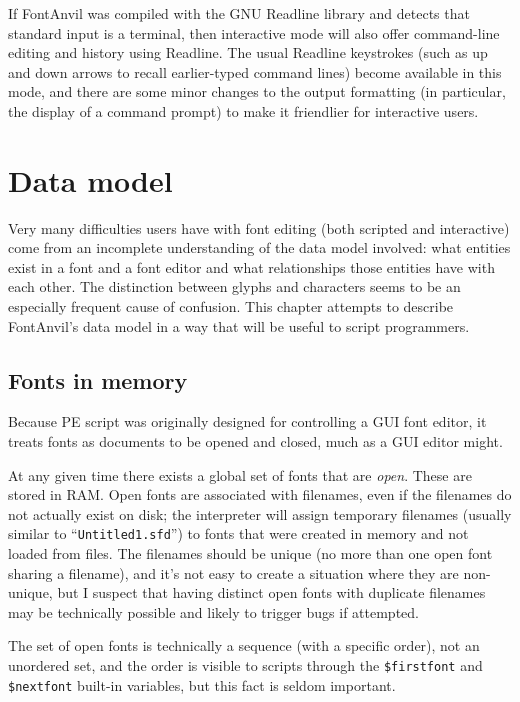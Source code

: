 \documentclass[11pt]{report}
\begin{document}
If FontAnvil was compiled with the GNU Readline library and detects that
standard input is a terminal, then interactive mode will also offer
command-line editing and history using Readline.  The usual Readline
keystrokes (such as up and down arrows to recall earlier-typed command
lines) become available in this mode, and there are some minor changes to
the output formatting (in particular, the display of a command prompt) to
make it friendlier for interactive users.


\chapter{Data model}
\label{sec:data-model}

Very many difficulties users have with font editing (both scripted and
interactive) come from an incomplete understanding of the data model
involved: what entities exist in a font and a font editor and what
relationships those entities have with each other.  The distinction between
glyphs and characters seems to be an especially frequent cause of confusion. 
This chapter attempts to describe FontAnvil's data model in a way that will
be useful to script programmers.

\section{Fonts in memory}

Because PE script was originally designed for controlling a GUI font
editor, it treats fonts as documents to be opened and closed, much as
a GUI editor might.

At any given time there exists a global set of fonts that are \emph{open}. 
These are stored in RAM.  Open fonts are associated with filenames, even if
the filenames do not actually exist on disk; the interpreter will assign
temporary filenames (usually similar to ``\texttt{Untitled1.sfd}'') to fonts
that were created in memory and not loaded from files.  The filenames should
be unique (no more than one open font sharing a filename), and it's not easy
to create a situation where they are non-unique, but I suspect that having
distinct open fonts with duplicate filenames may be technically possible and
likely to trigger bugs if attempted.

The set of open fonts is technically a sequence (with a specific order), not
an unordered set, and the order is visible to scripts through the
\verb|$firstfont| and \verb|$nextfont| built-in variables, but this fact is
seldom important.
\end{document}
